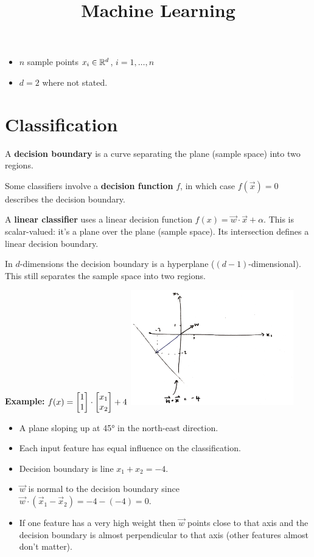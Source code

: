 \documentclass[12pt]{article}
\title{Machine Learning}
\newcommand{\x}{\vec x}
\newcommand{\w}{\vec w}
\begin{document}
\maketitle

\begin{itemize}
\item $n$ sample points $x_i \in \mathbb{R}^d$, $i = 1, \ldots, n$
\item $d = 2$ where not stated.
\end{itemize}

\section*{Classification}

A \textbf{decision boundary} is a curve separating the plane (sample space)
into two regions.

Some classifiers involve a \textbf{decision function} $f$, in which case
$f(\x) = 0$ describes the decision boundary.

A \textbf{linear classifier} uses a linear decision function
$f(x) = \w \cdot \x + \alpha$. This is scalar-valued: it's a plane over
the plane (sample space). Its intersection defines a linear decision boundary.

In $d$-dimensions the decision boundary is a hyperplane
($(d-1)$-dimensional). This still separates the sample space into two regions.

\textbf{Example:} $f(x) = \begin{bmatrix}1\\1\end{bmatrix} \cdot \begin{bmatrix}x_1\\x_2\end{bmatrix} + 4$
\includegraphics[width=200pt]{img/machine-learning-linear-decision-boundary.png}
\begin{itemize}
\item A plane sloping up at 45° in the north-east direction.
\item Each input feature has equal influence on the classification.
\item Decision boundary is line $x_1 + x_2 = -4$.
\item $\w$ is normal to the decision boundary since $\w \cdot (\x_1 - \x_2) = -4 - (-4) = 0$.
\item If one feature has a very high weight then $\w$ points close to that
  axis and the decision boundary is almost perpendicular to that axis (other
  features almost don't matter).
\end{itemize}
\end{document}
